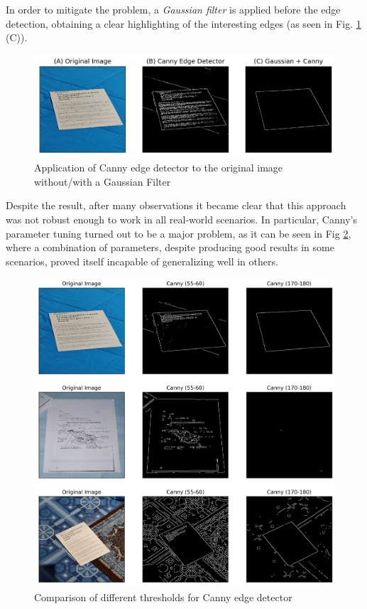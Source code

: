 \documentclass[a4paper]{article}
\begin{document}
In order to mitigate the problem, a \textit{Gaussian filter} is applied before the edge detection, obtaining a clear highlighting of the interesting edges (as seen in Fig.  \ref{fig:canny_gaussian} (C)).

\begin{figure}[!htb]
	\includegraphics[width=\linewidth]{canny_gaussian.png}
	\caption{Application of Canny edge detector to the original image without/with a Gaussian Filter}
	\label{fig:canny_gaussian}
\end{figure}

Despite the result, after many observations it became clear that this approach was not robust enough to
work in all real-world scenarios. In particular, Canny's parameter tuning turned out to be a major
problem, as it can be seen in Fig \ref{fig:canny_comparison}, where a combination of parameters,
despite producing good results in some scenarios, proved itself incapable of generalizing well in others.

\begin{figure}[htb!]
	\includegraphics[width=\linewidth]{canny_comparison.png}
	\caption{Comparison of different thresholds for Canny edge detector}
	\label{fig:canny_comparison}
\end{figure}
\end{document}
